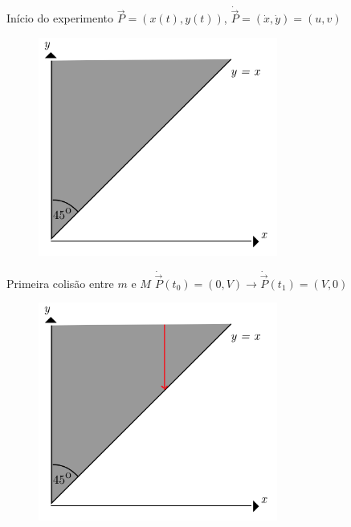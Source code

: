 \documentclass{beamer}
\begin{document}
\begin{frame}{Início do experimento}
  $\vec{P}=(x(t), y(t))$, $\dot{\vec{P}}=(\dot x,\dot y)=(u, v)$
  \begin{figure}
    \centering
    \includegraphics[width=0.7\textwidth]{images/image1-1.png}
  \end{figure}
\end{frame}

\begin{frame}{Primeira colisão entre $m$ e $M$}
  $\dot{\vec{P}}(t_0)=(0,V)\to\dot{\vec{P}}(t_1)=(V,0)$
  \begin{figure}
    \centering
    \includegraphics[width=0.7\textwidth]{images/image1-2.png}
  \end{figure}
\end{frame}
\end{document}
